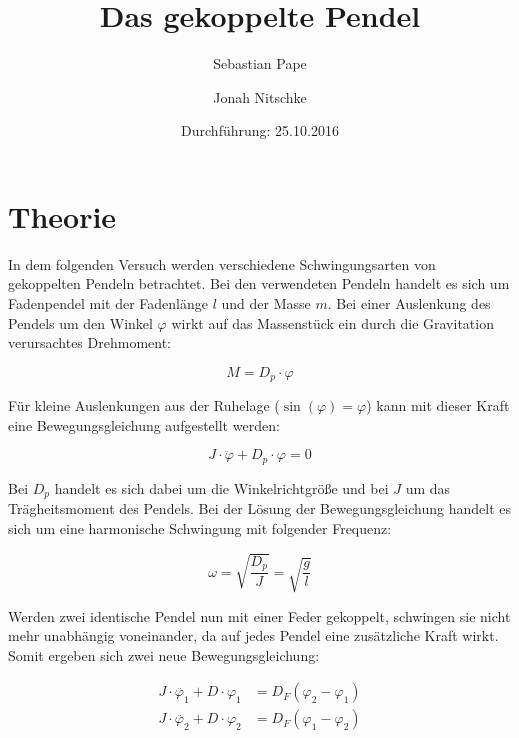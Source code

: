 

\subject{106}
\title{Das gekoppelte Pendel}
\author{Sebastian Pape \and Jonah Nitschke}
\date{Durchführung: 25.10.2016}



\maketitle

\section{Theorie}

In dem folgenden Versuch werden verschiedene Schwingungsarten von gekoppelten Pendeln betrachtet.
Bei den verwendeten Pendeln handelt es sich um Fadenpendel mit der Fadenlänge $l$ und der Masse $m$.
Bei einer Auslenkung des Pendels um den Winkel $\varphi$ wirkt auf das Massenstück ein durch die
Gravitation verursachtes Drehmoment:

\begin{equation}
  M = D_p \cdot \varphi
\end{equation}

Für kleine Auslenkungen aus der Ruhelage ($\sin(\varphi) = \varphi$) kann mit dieser Kraft eine
Bewegungsgleichung aufgestellt werden:

\begin{equation}
  J \cdot  \ddot{\varphi} + D_p \cdot \varphi = 0
\end{equation}

Bei $D_p$ handelt es sich dabei um die Winkelrichtgröße und bei $J$ um das Trägheitsmoment des Pendels.
Bei der Lösung der Bewegungsgleichung handelt es sich um eine harmonische Schwingung mit folgender
Frequenz:

\begin{equation}
  \omega = \sqrt{\frac{D_p}{J}} = \sqrt{\frac{g}{l}}
\end{equation}

Werden zwei identische Pendel nun mit einer Feder gekoppelt, schwingen sie nicht mehr unabhängig
voneinander, da auf jedes Pendel eine zusätzliche Kraft wirkt. Somit ergeben sich zwei neue
Bewegungsgleichung:

\begin{align}
  J \cdot  \ddot{\varphi_1} + D \cdot \varphi_1 &= D_F(\varphi_2 - \varphi_1) \\
  J \cdot  \ddot{\varphi_2} + D \cdot \varphi_2 &= D_F(\varphi_1 - \varphi_2)
\end{align}

